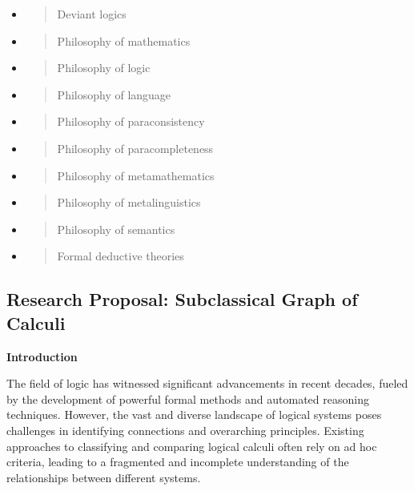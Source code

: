 \begin{itemize}
\item
  \begin{quote}
  Deviant logics
  \end{quote}
\item
  \begin{quote}
  Philosophy of mathematics
  \end{quote}
\item
  \begin{quote}
  Philosophy of logic
  \end{quote}
\item
  \begin{quote}
  Philosophy of language
  \end{quote}
\item
  \begin{quote}
  Philosophy of paraconsistency
  \end{quote}
\item
  \begin{quote}
  Philosophy of paracompleteness
  \end{quote}
\item
  \begin{quote}
  Philosophy of metamathematics
  \end{quote}
\item
  \begin{quote}
  Philosophy of metalinguistics
  \end{quote}
\item
  \begin{quote}
  Philosophy of semantics
  \end{quote}
\item
  \begin{quote}
  Formal deductive theories
  \end{quote}
\end{itemize}

\hypertarget{research-proposal-subclassical-graph-of-calculi}{%
\subsection{Research Proposal: Subclassical Graph of
Calculi}\label{research-proposal-subclassical-graph-of-calculi}}

\textbf{Introduction}

The field of logic has witnessed significant advancements in recent
decades, fueled by the development of powerful formal methods and
automated reasoning techniques. However, the vast and diverse landscape
of logical systems poses challenges in identifying connections and
overarching principles. Existing approaches to classifying and comparing
logical calculi often rely on ad hoc criteria, leading to a fragmented
and incomplete understanding of the relationships between different
systems.

